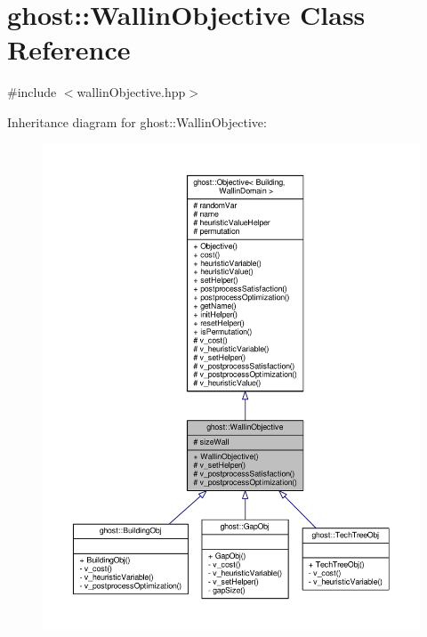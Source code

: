 \hypertarget{classghost_1_1WallinObjective}{\section{ghost\-:\-:Wallin\-Objective Class Reference}
\label{classghost_1_1WallinObjective}
}


{\ttfamily \#include $<$wallin\-Objective.\-hpp$>$}



Inheritance diagram for ghost\-:\-:Wallin\-Objective\-:\nopagebreak
\begin{figure}[H]
\begin{center}
\leavevmode
\includegraphics[width=350pt]{classghost_1_1WallinObjective__inherit__graph}
\end{center}
\end{figure}



